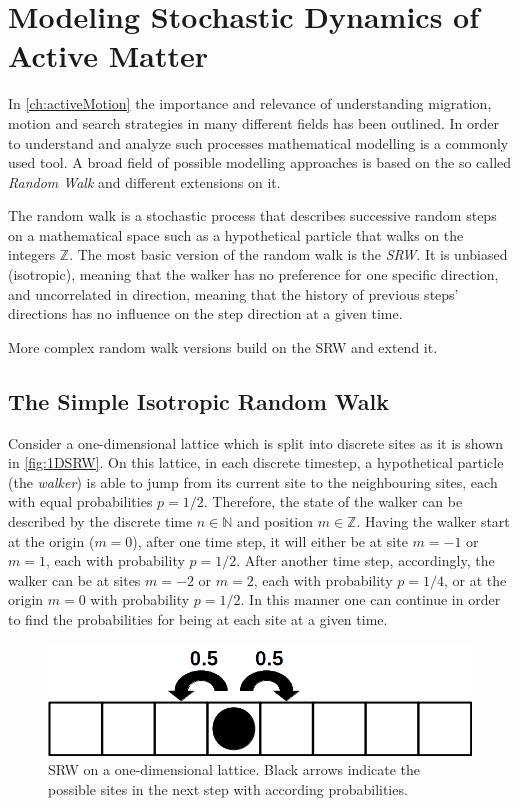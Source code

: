 \chapter{Modeling Stochastic Dynamics of Active Matter}\label{ch:modelingActiveMatter}
In \autoref{ch:activeMotion} the importance and relevance of understanding migration, motion and search strategies in many different fields has been outlined. In order to understand and analyze such processes mathematical modelling is a commonly used tool. A broad field of possible modelling approaches is based on the so called \textit{Random Walk} and different extensions on it.

The random walk is a stochastic process that describes successive random steps on a mathematical space such as a hypothetical particle that walks on the integers $\mathbb{Z}$. The most basic version of the random walk is the \textit{\ac{SRW}}. It is unbiased (isotropic), meaning that the walker has no preference for one specific direction, and uncorrelated in direction, meaning that the history of previous steps' directions has no influence on the step direction at a given time.

More complex random walk versions build on the \acs{SRW} and extend it.

\section{The Simple Isotropic Random Walk}
Consider a one-dimensional lattice which is split into discrete sites as it is shown in \autoref{fig:1DSRW}. On this lattice, in each discrete timestep, a hypothetical particle (the \textit{walker}) is able to jump from its current site to the neighbouring sites, each with equal probabilities $p=1/2$. Therefore, the state of the walker can be described by the discrete time $n \in \mathbb{N}$ and position $m \in \mathbb{Z}$. Having the walker start at the origin ($m=0$), after one time step, it will either be at site $m=-1$ or $m=1$, each with probability $p=1/2$. After another time step, accordingly, the walker can be at sites $m=-2$ or $m=2$, each with probability $p=1/4$, or at the origin $m=0$ with probability $p=1/2$. In this manner one can continue in order to find the probabilities for being at each site at a given time.

\begin{figure}[bth]
 \myfloatalign
 \includegraphics[width=0.8\linewidth]{gfx/1DSRW}
 \caption[\acs{SRW} on a one-dimensional lattice]{\acs{SRW} on a one-dimensional lattice. Black arrows indicate the possible sites in the next step with according probabilities.}\label{fig:1DSRW}
\end{figure}

